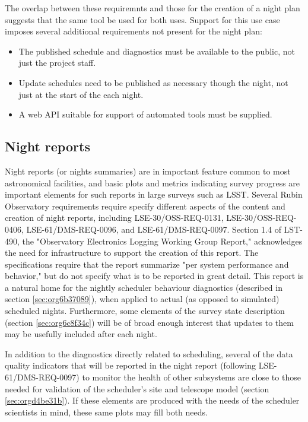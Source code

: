 The overlap between these requiremnts and those for the creation of a night plan suggests that the same tool be used for both uses. 
Support for this use case imposes several additional requirements not present for the night plan:
\begin{itemize}
\item The published schedule and diagnostics must be available to the public, not just the project staff.
\item Update schedules need to be published as necessary though the night, not just at the start of the each night.
\item A web API suitable for support of automated tools must be supplied.
\end{itemize}

\subsection{Night reports}
\label{sec:org75592ae}
Night reports (or nights summaries) are in important feature common to most astronomical facilities, and basic plots and metrics indicating survey progress are important elements for such reports in large surveys such as LSST.
Several Rubin Observatory requirements require specify different aspects of the content and creation of night reports, including LSE-30/OSS-REQ-0131, LSE-30/OSS-REQ-0406, LSE-61/DMS-REQ-0096, and LSE-61/DMS-REQ-0097. Section 1.4 of LST-490, the "Observatory Electronics Logging Working Group Report," acknowledges the need for infrastructure to support the creation of this report.
The specifications require that the report summarize "per system performance and behavior," but do not specify what is to be reported in great detail.
This report is a natural home for the nightly scheduler behaviour diagnostics (described in section \ref{sec:org6b37089}), when applied to actual (as opposed to simulated) scheduled nights.
Furthermore, some elements of the survey state description (section \ref{sec:org6c8f34c}) will be of broad enough interest that updates to them may be usefully included after each night.

In addition to the diagnostics directly related to scheduling, several of the data quality indicators that will be reported in the night report (following LSE-61/DMS-REQ-0097) to monitor the health of other subsystems are close to those needed for validation of the scheduler's site and telescope model (section \ref{sec:orgd4be31b}). If these elements are produced with the needs of the scheduler scientists in mind, these same plots may fill both needs.

